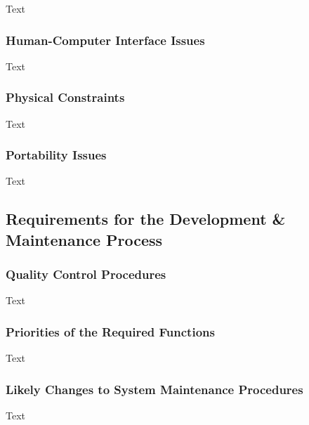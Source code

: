 \documentclass[12pt]{article}
\begin{document}
Text

\subsubsection {Human-Computer Interface Issues}

Text

\subsubsection {Physical Constraints}

Text

\subsubsection {Portability Issues}

Text

\subsection{Requirements for the Development \& Maintenance Process}

\subsubsection {Quality Control Procedures}

Text

\subsubsection {Priorities of the Required Functions}

Text

\subsubsection {Likely Changes to System Maintenance Procedures}

Text
\end{document}
